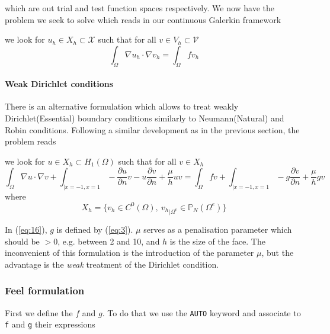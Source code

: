 which are out trial and test function spaces respectively.  We now
have the problem we seek to solve which reads in our continuous
Galerkin framework
\begin{problem}
  \label{prob:2}
  we look for $u_h \in X_h \subset \mathcal{X}$ such that for all $v
  \in V_h \subset \mathcal{V}$
  \begin{equation}
    \label{eq:20}
    \int_\Omega \nabla u_h \cdot \nabla v_h  = \int_\Omega f v_h
  \end{equation}
\end{problem}

\paragraph{Weak Dirichlet conditions}
\label{sec:weak-dirichl-cond}

There is an alternative formulation which allows to treat weakly
Dirichlet(Essential) boundary conditions similarly to Neumann(Natural)
and Robin conditions. Following a similar development as in the previous section, the problem reads
\begin{problem}
  \label{prob:3}
  we look for $u \in X_h \subset H_1(\Omega)$ such that for all $v \in
  X_h$
\begin{equation}
  \label{eq:16}
  \int_\Omega \nabla u \cdot \nabla v +
  \int_{|x=-1,x=1} -\frac{\partial u}{\partial n} v - u \frac{\partial v}{\partial n} + \frac{\mu}{h} u v
  =
  \int_\Omega f v +
  \int_{|x=-1,x=1}  - g \frac{\partial v}{\partial n} + \frac{\mu}{h} g v
\end{equation}
where
\begin{equation}
  \label{eq:19}
  X_h = \Big\{ v_h \in C^0(\Omega),\ {v_h}_{|\Omega^e} \in \mathbb{P}_N( \Omega^e ) \Big\}
\end{equation}
\end{problem}
In (\ref{eq:16}), $g$ is defined by (\ref{eq:3}). $\mu$ serves as a penalisation
parameter which should be $> 0$, e.g. between 2 and 10, and $h$ is the
size of the face. The inconvenient of this formulation is the
introduction of the parameter $\mu$, but the advantage is the
\emph{weak} treatment of the Dirichlet condition.

\subsubsection{Feel formulation}
\label{sec:feel-formulation-1}

First we define the $f$ and $g$. To do that we use the
\lstinline!AUTO! keyword and associate to \lstinline!f! and
\lstinline!g! their expressions

